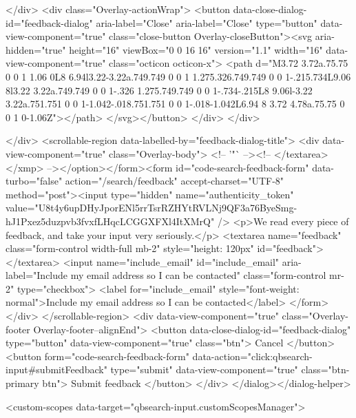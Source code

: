     </div>
    <div class="Overlay-actionWrap">
      <button data-close-dialog-id="feedback-dialog" aria-label="Close" aria-label="Close" type="button" data-view-component="true" class="close-button Overlay-closeButton"><svg aria-hidden="true" height="16" viewBox="0 0 16 16" version="1.1" width="16" data-view-component="true" class="octicon octicon-x">
    <path d="M3.72 3.72a.75.75 0 0 1 1.06 0L8 6.94l3.22-3.22a.749.749 0 0 1 1.275.326.749.749 0 0 1-.215.734L9.06 8l3.22 3.22a.749.749 0 0 1-.326 1.275.749.749 0 0 1-.734-.215L8 9.06l-3.22 3.22a.751.751 0 0 1-1.042-.018.751.751 0 0 1-.018-1.042L6.94 8 3.72 4.78a.75.75 0 0 1 0-1.06Z"></path>
</svg></button>
    </div>
  </div>
  
</div>
      <scrollable-region data-labelled-by="feedback-dialog-title">
        <div data-view-component="true" class="Overlay-body">        <!-- '"` --><!-- </textarea></xmp> --></option></form><form id="code-search-feedback-form" data-turbo="false" action="/search/feedback" accept-charset="UTF-8" method="post"><input type="hidden" name="authenticity_token" value="U8t4y6upDHyJporENl5rrTsrRZHYtRVLNj9QF3a76ByeSmg-hJ1Pxez5duzpvb3fvxfLHqcLCGGXFXl4ItXMrQ" />
          <p>We read every piece of feedback, and take your input very seriously.</p>
          <textarea name="feedback" class="form-control width-full mb-2" style="height: 120px" id="feedback"></textarea>
          <input name="include_email" id="include_email" aria-label="Include my email address so I can be contacted" class="form-control mr-2" type="checkbox">
          <label for="include_email" style="font-weight: normal">Include my email address so I can be contacted</label>
</form></div>
      </scrollable-region>
      <div data-view-component="true" class="Overlay-footer Overlay-footer--alignEnd">          <button data-close-dialog-id="feedback-dialog" type="button" data-view-component="true" class="btn">    Cancel
</button>
          <button form="code-search-feedback-form" data-action="click:qbsearch-input#submitFeedback" type="submit" data-view-component="true" class="btn-primary btn">    Submit feedback
</button>
</div>
</dialog></dialog-helper>

    <custom-scopes data-target="qbsearch-input.customScopesManager">
    
